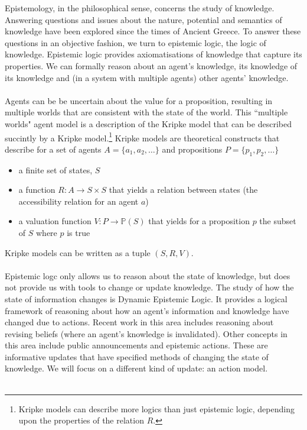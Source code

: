 \documentclass[12pt, a4paper]{article}
\begin{document}
Epistemology, in the philosophical sense, concerns the study of knowledge.
Answering questions and issues about the nature, potential and semantics of knowledge have been explored since the times of Ancient Greece.
To answer these questions in an objective fashion, we turn to epistemic logic, the logic of knowledge.
Epistemic logic provides axiomatisations of knowledge that capture its properties.
We can formally reason about an agent's knowledge, its knowledge of its knowledge and (in a system with multiple agents) other agents' knowledge. \cite{van2008dynamic}\\
\\
Agents can be be uncertain about the value for a proposition, resulting in multiple worlds that are consistent with the state of the world.
This ``multiple worlds" agent model is a description of the Kripke model that can be described succintly by a Kripke model.\footnote{Kripke models can describe more logics than just epistemic logic, depending upon the properties of the relation $R$.}
Kripke models are theoretical constructs that describe for a set of agents $A = \{a_1, a_2, \ldots\}$ and propositions $P = \{p_1, p_2, \ldots \}$
\begin{itemize}
  \item a finite set of states, $S$
  \item a function $R: A \to S \times S$ that yields a relation between states (the accessibility relation for an agent $a$)
  \item a valuation function $V: P \to \mathbb{P}(S)$ that yields for a proposition $p$ the subset of $S$ where $p$ is true
\end{itemize}
Kripke models can be written as a tuple $(S, R, V)$.\\
\\
Epistemic logc only allows us to reason about the state of knowledge, but does not provide us with tools to change or update knowledge.
The study of how the state of information changes is Dynamic Epistemic Logic.
It provides a logical framework of reasoning about how an agent's information and knowledge have changed due to actions.
Recent work in this area includes reasoning about revising beliefs (where an agent's knowledge is invalidated).
Other concepts in this area include public announcements and epistemic actions.
These are informative updates that have specified methods of changing the state of knowledge.
We will focus on a different kind of update: an action model.\\
\\
\end{document}
